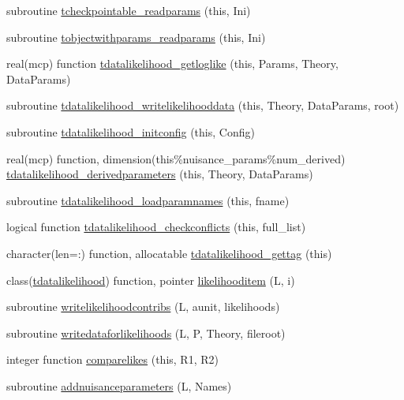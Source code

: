 \begin{DoxyCompactItemize}
subroutine \mbox{\hyperlink{namespacegeneraltypes_ad37138d6b09c9e6feda0357b1c94e85a}{tcheckpointable\+\_\+readparams}} (this, Ini)
\item 
subroutine \mbox{\hyperlink{namespacegeneraltypes_aebd5d13abc4092b06e3e6164880ee11a}{tobjectwithparams\+\_\+readparams}} (this, Ini)
\item 
real(mcp) function \mbox{\hyperlink{namespacegeneraltypes_a44032002cc7bece9f328a839b5830b5d}{tdatalikelihood\+\_\+getloglike}} (this, Params, Theory, Data\+Params)
\item 
subroutine \mbox{\hyperlink{namespacegeneraltypes_a077299298ffed6e9dea751a27ca45507}{tdatalikelihood\+\_\+writelikelihooddata}} (this, Theory, Data\+Params, root)
\item 
subroutine \mbox{\hyperlink{namespacegeneraltypes_abae245dbb211bd2f44ed4267e47206de}{tdatalikelihood\+\_\+initconfig}} (this, Config)
\item 
real(mcp) function, dimension(this\%nuisance\+\_\+params\%num\+\_\+derived) \mbox{\hyperlink{namespacegeneraltypes_a6bb9fb37002b4265a3a4f438c4b045fa}{tdatalikelihood\+\_\+derivedparameters}} (this, Theory, Data\+Params)
\item 
subroutine \mbox{\hyperlink{namespacegeneraltypes_aaea05ea7158416ca57ed2178bdac9431}{tdatalikelihood\+\_\+loadparamnames}} (this, fname)
\item 
logical function \mbox{\hyperlink{namespacegeneraltypes_a07c63d132f04e331ccb42e8f96080129}{tdatalikelihood\+\_\+checkconflicts}} (this, full\+\_\+list)
\item 
character(len=\+:) function, allocatable \mbox{\hyperlink{namespacegeneraltypes_a6578bd73fe17b7b10bb5740695d0fb5f}{tdatalikelihood\+\_\+gettag}} (this)
\item 
class(\mbox{\hyperlink{structgeneraltypes_1_1tdatalikelihood}{tdatalikelihood}}) function, pointer \mbox{\hyperlink{namespacegeneraltypes_aaebd3447ba557d8cc1c3f2b5ca98456d}{likelihooditem}} (L, i)
\item 
subroutine \mbox{\hyperlink{namespacegeneraltypes_a26624f9233a06ac3e62f6bdb2ad416f8}{writelikelihoodcontribs}} (L, aunit, likelihoods)
\item 
subroutine \mbox{\hyperlink{namespacegeneraltypes_af94e150476d45f72d492e761a2d02ab5}{writedataforlikelihoods}} (L, P, Theory, fileroot)
\item 
integer function \mbox{\hyperlink{namespacegeneraltypes_aa824e634d28fc4010383a833af894aee}{comparelikes}} (this, R1, R2)
\item 
subroutine \mbox{\hyperlink{namespacegeneraltypes_af520b2d286223bb2ce63b94b5c1349b6}{addnuisanceparameters}} (L, Names)

\end{DoxyCompactItemize}
